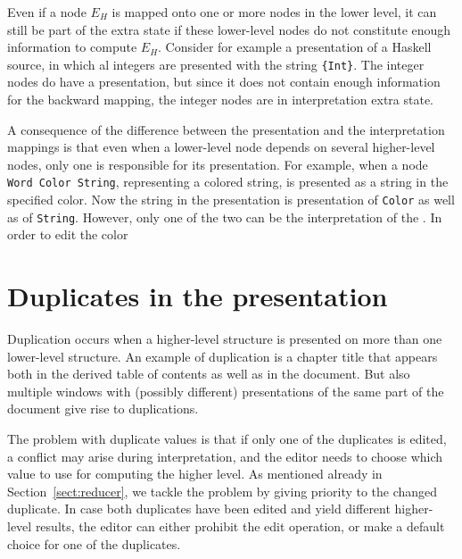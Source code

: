 \bc
Even if a node $E_H$ is mapped onto one or more nodes in the lower level, it can still be part of the extra state if these lower-level nodes do not constitute enough information to compute $E_H$. Consider for example a presentation of a Haskell source, in which al integers are presented with the string \verb|{Int}|. The integer nodes do have a presentation, but since it does not contain enough information for the backward mapping, the integer nodes are in interpretation extra state.  
\ec


\bc
A consequence of the difference between the presentation and the interpretation mappings is that even when a lower-level node depends on several higher-level nodes, only one is responsible for its presentation. For example, when a node \verb|Word Color String|, representing a colored string, is presented as a string in the specified color. Now the string in the presentation is presentation of \verb|Color| as well as of \verb|String|. However, only one of the two can be the interpretation of the . In order to edit the color
\ec











%																
%																
%																
\section{Duplicates in the presentation} \label{sect:informalDuplicates}


Duplication occurs when a higher-level structure is presented on more than one lower-level structure. An example of duplication is a chapter title that appears both in the derived table of contents as well as in the document. But also multiple windows with (possibly different) presentations of the same part of the document give rise to duplications. 

The problem with duplicate values is that if only one of the duplicates is edited, a conflict may arise during interpretation, and the editor needs to choose which value to use for computing the higher level. As mentioned already in Section~\ref{sect:reducer}, we tackle the problem by giving priority to the changed duplicate. In case both duplicates have been edited and yield different higher-level results, the editor can either prohibit the edit operation, or make a default choice for one of the duplicates.

